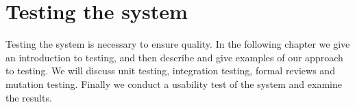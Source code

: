 \chapter{Testing the system}\label{chap:testing-the-system}
Testing the system is necessary to ensure quality.
In the following chapter we give an introduction to testing, and then describe and give examples of our approach to testing.
We will discuss unit testing, integration testing, formal reviews and mutation testing.
Finally we conduct a usability test of the system and examine the results.







